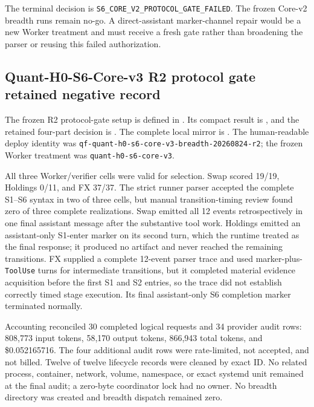 The terminal decision is
\texttt{S6\_CORE\_V2\_PROTOCOL\_GATE\_FAILED}. The frozen Core-v2 breadth runs
remain no-go. A direct-assistant marker-channel repair would be a new Worker
treatment and must receive a fresh gate rather than broadening the parser or
reusing this failed authorization.

\subsection{Quant-H0-S6-Core-v3 R2 protocol gate retained negative record}

The frozen R2 protocol-gate setup is defined in
. Its compact
result is
,
and the retained four-part decision is
.
The complete local mirror is
.
The human-readable deploy identity was
\texttt{qf-quant-h0-s6-core-v3-breadth-20260824-r2}; the frozen Worker
treatment was \texttt{quant-h0-s6-core-v3}.

All three Worker/verifier cells were valid for selection. Swap scored 19/19,
Holdings 0/11, and FX 37/37. The strict runner parser accepted the complete
S1--S6 syntax in two of three cells, but manual transition-timing review found
zero of three complete realizations. Swap emitted all 12 events retrospectively
in one final assistant message after the substantive tool work. Holdings
emitted an assistant-only S1-enter marker on its second turn, which the runtime
treated as the final response; it produced no artifact and never reached the
remaining transitions. FX supplied a complete 12-event parser trace and used
marker-plus-\texttt{ToolUse} turns for intermediate transitions, but it completed
material evidence acquisition before the first S1 and S2 entries, so the trace
did not establish correctly timed stage execution. Its final assistant-only S6
completion marker terminated normally.

Accounting reconciled 30 completed logical requests and 34 provider audit
rows: 808,773 input tokens, 58,170 output tokens, 866,943 total tokens, and
\$0.052165716. The four additional audit rows were rate-limited, not accepted,
and not billed. Twelve of twelve lifecycle records were cleaned by exact ID.
No related process, container, network, volume, namespace, or exact systemd
unit remained at the final audit; a zero-byte coordinator lock had no owner.
No breadth directory was created and breadth dispatch remained zero.


